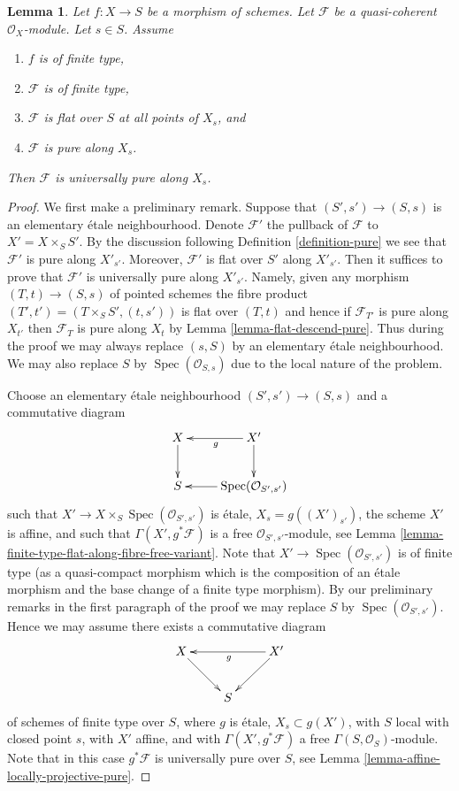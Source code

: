 \documentclass{amsart}
\theoremstyle{plain}
\newtheorem{lemma}[subsection]{Lemma}
\theoremstyle{definition}
\theoremstyle{remark}
\numberwithin{equation}{subsection}
\def\Spec{\mathop{\mathrm{Spec}}}
\begin{document}
\begin{lemma}
\label{lemma-finite-type-flat-pure-along-fibre-is-universal}
Let $f : X \to S$ be a morphism of schemes.
Let $\mathcal{F}$ be a quasi-coherent $\mathcal{O}_X$-module.
Let $s \in S$.
Assume
\begin{enumerate}
\item $f$ is of finite type,
\item $\mathcal{F}$ is of finite type,
\item $\mathcal{F}$ is flat over $S$ at all points of $X_s$, and
\item $\mathcal{F}$ is pure along $X_s$.
\end{enumerate}
Then $\mathcal{F}$ is universally pure along $X_s$.
\end{lemma}

\begin{proof}
We first make a preliminary remark. Suppose that $(S', s') \to (S, s)$
is an elementary \'etale neighbourhood. Denote $\mathcal{F}'$ the
pullback of $\mathcal{F}$ to $X' = X \times_S S'$.
By the discussion following
Definition \ref{definition-pure}
we see that $\mathcal{F}'$ is pure along $X'_{s'}$. Moreover, $\mathcal{F}'$
is flat over $S'$ along $X'_{s'}$. Then it suffices to prove
that $\mathcal{F}'$ is universally pure along $X'_{s'}$. Namely, given
any morphism $(T, t) \to (S, s)$ of pointed schemes
the fibre product $(T', t') = (T \times_S S', (t, s'))$ is flat over $(T, t)$
and hence if $\mathcal{F}_{T'}$ is pure along $X_{t'}$ then
$\mathcal{F}_T$ is pure along $X_t$ by
Lemma \ref{lemma-flat-descend-pure}.
Thus during the proof we may always replace $(s, S)$ by an elementary
\'etale neighbourhood.
We may also replace $S$ by $\Spec(\mathcal{O}_{S, s})$
due to the local nature of the problem.

\medskip\noindent
Choose an elementary \'etale neighbourhood $(S', s') \to (S, s)$ and
a commutative diagram
$$
\xymatrix{
X \ar[d] & X' \ar[l]^g \ar[d] \\
S & \Spec(\mathcal{O}_{S', s'}) \ar[l]
}
$$
such that $X' \to X \times_S \Spec(\mathcal{O}_{S', s'})$
is \'etale, $X_s = g((X')_{s'})$, the scheme $X'$ is affine,
and such that $\Gamma(X', g^*\mathcal{F})$ is a free
$\mathcal{O}_{S', s'}$-module, see
Lemma \ref{lemma-finite-type-flat-along-fibre-free-variant}.
Note that $X' \to \Spec(\mathcal{O}_{S', s'})$ is of finite type
(as a quasi-compact morphism which is the composition of an \'etale morphism
and the base change of a finite type morphism).
By our preliminary remarks in the first paragraph of the proof
we may replace $S$ by $\Spec(\mathcal{O}_{S', s'})$. Hence
we may assume there exists a commutative diagram
$$
\xymatrix{
X \ar[dr] & & X' \ar[ll]^g \ar[ld] \\
& S &
}
$$
of schemes of finite type over $S$, where $g$ is \'etale, $X_s \subset g(X')$,
with $S$ local with closed point $s$, with $X'$ affine, and with
$\Gamma(X', g^*\mathcal{F})$ a free $\Gamma(S, \mathcal{O}_S)$-module.
Note that in this case $g^*\mathcal{F}$ is universally pure over $S$, see
Lemma \ref{lemma-affine-locally-projective-pure}.


\end{proof}
\end{document}
